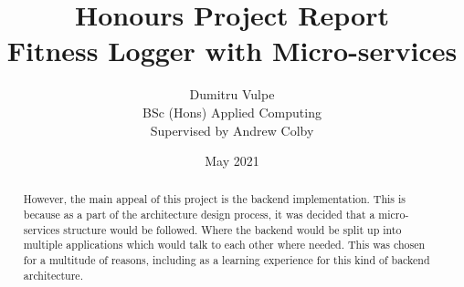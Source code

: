 \documentclass{article}
\title{Honours Project Report\\Fitness Logger with Micro-services}
\author{Dumitru Vulpe\\BSc (Hons) Applied Computing\\Supervised by Andrew Colby}
\date{May 2021}
\begin{document}
\maketitle

\vspace*{\fill/2}
\begin{abstract} 

However, the main appeal of this project is the backend implementation. This is because as a part of the architecture design process, it was decided that a micro-services structure would be followed. Where the backend would be split up into multiple applications which would talk to each other where needed. This was chosen for a multitude of reasons, including as a learning experience for this kind of backend architecture.\\

\end{abstract}
\vspace*{\fill}

\newpage
\tableofcontents 
\listoffigures
\newpage
\end{document}
